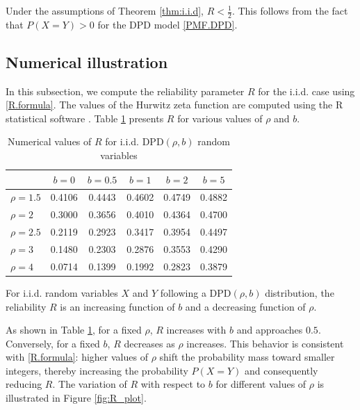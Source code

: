 \documentclass[twoside]{article}
\begin{document}
 
\begin{cor}\label{cor:RltHalf} 
Under the assumptions of Theorem \ref{thm:i.i.d}, $R < \frac{1}{2}$. This follows from the fact that $P(X=Y) > 0$ for the DPD model \eqref{PMF.DPD}. 
\end{cor}


\subsection{Numerical illustration}
In this subsection, we compute the reliability parameter $R$ for the i.i.d. case using \eqref{R.formula}. The values of the Hurwitz zeta function are computed using the \textsf{R} statistical software \cite{RCore:2026}. Table \ref{tab:R_values} presents $R$ for various values of $\rho$ and $b$. 
 

 

 
\begin{table}[ht] 
\centering 
\caption{Numerical values of $R$ for i.i.d. $\mathrm{DPD}(\rho,b)$ random variables} 
\label{tab:R_values} 
\begin{tabular}{lccccc} \hline & $b=0$ & $b=0.5$ & $b=1$ & $b=2$ & $b=5$ \\ \hline $\rho=1.5$ & 0.4106 & 0.4443 & 0.4602 & 0.4749 & 0.4882 \\ $\rho=2$ & 0.3000 & 0.3656 & 0.4010 & 0.4364 & 0.4700 \\ $\rho=2.5$ & 0.2119 & 0.2923 & 0.3417 & 0.3954 & 0.4497 \\ $\rho=3$ & 0.1480 & 0.2303 & 0.2876 & 0.3553 & 0.4290 \\ $\rho=4$ & 0.0714 & 0.1399 & 0.1992 & 0.2823 & 0.3879 \\ \hline 
\end{tabular} 
\end{table}


\begin{prop} 
For i.i.d. random variables $X$ and $Y$ following a $\mathrm{DPD}(\rho, b)$ distribution, the reliability $R$ is an increasing function of $b$ and a decreasing function of $\rho$. 
\end{prop} 

As shown in Table \ref{tab:R_values}, for a fixed $\rho$, $R$ increases with $b$ and approaches $0.5$. Conversely, for a fixed $b$, $R$ decreases as $\rho$ increases. This behavior is consistent with \eqref{R.formula}:  higher values of $\rho$ shift the probability mass toward smaller integers, thereby increasing the probability $P(X=Y)$  and consequently reducing $R$.   The variation of $R$ with respect to $b$ for different values of $\rho$ is illustrated in Figure \ref{fig:R_plot}. 
 
\end{document}
